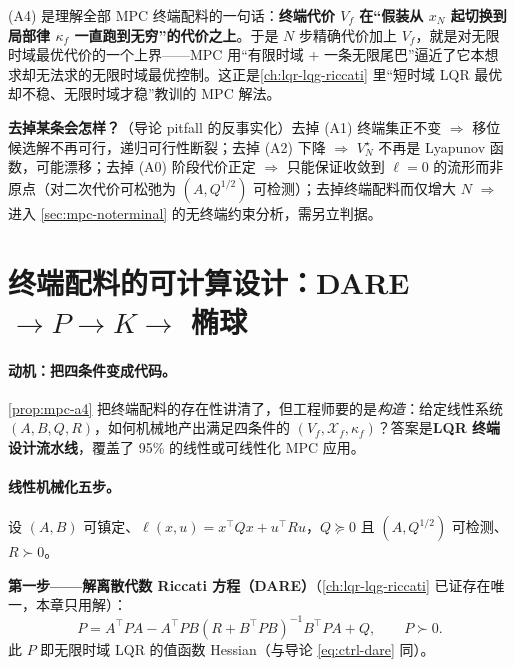 \begin{insight}
(A4) 是理解全部 MPC 终端配料的一句话：\textbf{终端代价 $V_f$ 在“假装从 $x_N$ 起切换到局部律 $\kappa_f$ 一直跑到无穷”的代价之上}。于是 $N$ 步精确代价加上 $V_f$，就是对无限时域最优代价的一个上界——MPC 用“有限时域 + 一条无限尾巴”逼近了它本想求却无法求的无限时域最优控制。这正是\cref{ch:lqr-lqg-riccati} 里“短时域 LQR 最优却不稳、无限时域才稳”教训的 MPC 解法。
\end{insight}

\begin{remark}
\textbf{去掉某条会怎样？}（导论 pitfall 的反事实化）去掉 (A1) 终端集正不变 $\Rightarrow$ 移位候选解不再可行，递归可行性断裂；去掉 (A2) 下降 $\Rightarrow$ $V_N^\star$ 不再是 Lyapunov 函数，可能漂移；去掉 (A0) 阶段代价正定 $\Rightarrow$ 只能保证收敛到 $\ell=0$ 的流形而非原点（对二次代价可松弛为 $(A,Q^{1/2})$ 可检测）；去掉终端配料而仅增大 $N$ $\Rightarrow$ 进入 \cref{sec:mpc-noterminal} 的无终端约束分析，需另立判据。
\end{remark}

\section{终端配料的可计算设计：DARE \texorpdfstring{$\to P\to K\to$}{ -> P -> K -> } 椭球}
\label{sec:mpc-terminal}

\paragraph{动机：把四条件变成代码。}
\cref{prop:mpc-a4} 把终端配料的存在性讲清了，但工程师要的是\emph{构造}：给定线性系统 $(A,B,Q,R)$，如何机械地产出满足四条件的 $(V_f,\mathcal X_f,\kappa_f)$？答案是\textbf{LQR 终端设计流水线}，覆盖了 95\% 的线性或可线性化 MPC 应用。

\paragraph{线性机械化五步。}
设 $(A,B)$ 可镇定、$\ell(x,u)=x^\top Qx+u^\top Ru$，$Q\succeq0$ 且 $(A,Q^{1/2})$ 可检测、$R\succ0$。

\textbf{第一步——解离散代数 Riccati 方程（DARE）}（\cref{ch:lqr-lqg-riccati} 已证存在唯一，本章只用解）：
\begin{equation}
  P=A^\top PA-A^\top PB(R+B^\top PB)^{-1}B^\top PA+Q,\qquad P\succ0.
  \label{eq:mpc-dare}
\end{equation}
此 $P$ 即无限时域 LQR 的值函数 Hessian（与导论 \cref{eq:ctrl-dare} 同）。

